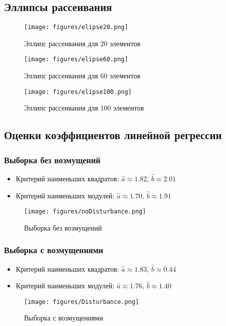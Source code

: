 \documentclass[../main.tex]{subfiles}
\begin{document}
    \subsection{Эллипсы рассеивания}
    \begin{figure}[H]
        \centering
        \texttt{[image: figures/elipse20.png]}
        \caption{Эллипс рассеивания для 20 элементов}
    \end{figure}
    
    \begin{figure}[H]
        \centering
        \texttt{[image: figures/elipse60.png]}
        \caption{Эллипс рассеивания для 60 элементов}
    \end{figure}
    
    \begin{figure}[H]
        \centering
        \texttt{[image: figures/elipse100.png]}
        \caption{Эллипс рассеивания для 100 элементов}
    \end{figure}
    
    \subsection{Оценки коэффициентов линейной регрессии}
    \subsubsection{Выборка без возмущений}
		\begin{itemize}
			\item{Критерий наименьших квадратов:}
			$\hat{a}\approx 1.82$, $\hat{b}\approx 2.01$
			\item{Критерий наименьших модулей:}
			$\hat{a}\approx 1.70$, $\hat{b}\approx 1.91$
		\end{itemize}
		\begin{figure}[H]
			\centering
			\texttt{[image: figures/noDisturbance.png]}
			\caption{Выборка без возмущений}
			\label{w/o_pert}
		\end{figure}
	
	\subsubsection{Выборка с возмущениями}
		\begin{itemize}
			\item{Критерий наименьших квадратов:}
			$\hat{a}\approx 1.83$, $\hat{b}\approx 0.44$
			\item{Критерий наименьших модулей:}
			$\hat{a}\approx 1.76$, $\hat{b}\approx 1.40$
		\end{itemize}
		\begin{figure}[H]
			\centering
			\texttt{[image: figures/Disturbance.png]}
			\caption{Выборка с возмущениями}
			\label{w_pert}
		\end{figure}
		
\end{document}
